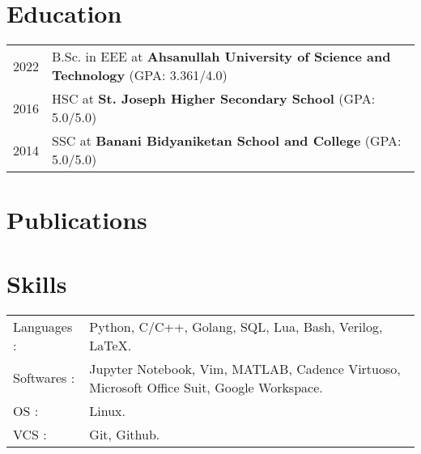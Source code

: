 \documentclass[a4paper,12pt]{article}
\begin{document}


\section{Education}
\begin{tabularx}{\linewidth}{@{}l X@{}}	
2022 & B.Sc. in EEE at \textbf{Ahsanullah University of Science and Technology} \hfill (GPA: 3.361/4.0) \\ 

2016 & HSC at \textbf{St. Joseph Higher Secondary School}  \hfill  (GPA: 5.0/5.0) \\

2014 & SSC at \textbf{Banani Bidyaniketan School and College}  \hfill  (GPA: 5.0/5.0) \\
\end{tabularx}



\section{Publications}
\begin{refsection}
\nocite{*}
\printbibliography[heading=none]
\end{refsection}



\section{Skills}
\begin{tabularx}{\linewidth}{@{}l X@{}}
Languages : &  \normalsize{Python, C/C++, Golang, SQL, Lua, Bash, Verilog, \LaTeX.}\\
Softwares : &  \normalsize{Jupyter Notebook, Vim, MATLAB, Cadence Virtuoso, Microsoft Office Suit, Google Workspace.}\\  
OS :  &  \normalsize{Linux.}\\ 
VCS : &  \normalsize{Git, Github.}\\
\end{tabularx}
\end{document}
